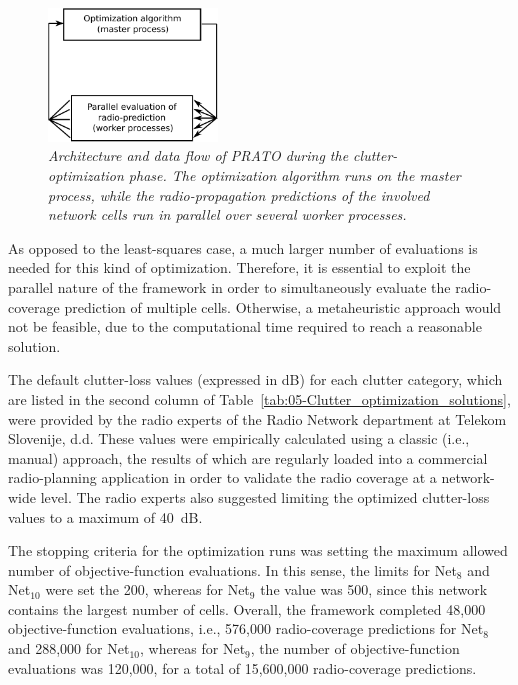 \begin{figure}
\centering

\includegraphics[width=0.4\textwidth]{05-framework_parameter_tuning/img/architecture}

\caption{\textit{\emph{Architecture and data flow of PRATO during the clutter-optimization
phase. The optimization algorithm runs on the master process, while
the radio-propagation predictions of the involved network cells run
in parallel over several worker processes. \label{fig:05-PRATO_architecture_optimization}}}}
\end{figure}


As opposed to the least-squares case, a much larger number of evaluations
is needed for this kind of optimization. Therefore, it is essential
to exploit the parallel nature of the framework in order to simultaneously
evaluate the radio-coverage prediction of multiple cells. Otherwise,
a metaheuristic approach would not be feasible, due to the computational
time required to reach a reasonable solution.

The default clutter-loss values (expressed in dB) for each clutter
category, which are listed in the second column of Table~\ref{tab:05-Clutter_optimization_solutions},
were provided by the radio experts of the Radio Network department
at Telekom Slovenije, d.d. These values were empirically calculated
using a classic (i.e., manual) approach, the results of which are
regularly loaded into a commercial radio-planning application in order
to validate the radio coverage at a network-wide level. The radio
experts also suggested limiting the optimized clutter-loss values
to a maximum of 40~dB.

The stopping criteria for the optimization runs was setting the maximum
allowed number of objective-function evaluations. In this sense, the
limits for Net$_{8}$ and Net$_{10}$ were set the 200, whereas for
Net$_{9}$ the value was 500, since this network contains the largest
number of cells. Overall, the framework completed 48,000 objective-function
evaluations, i.e., 576,000 radio-coverage predictions for Net$_{8}$
and 288,000 for Net$_{10}$, whereas for Net$_{9}$, the number of
objective-function evaluations was 120,000, for a total of 15,600,000
radio-coverage predictions.

